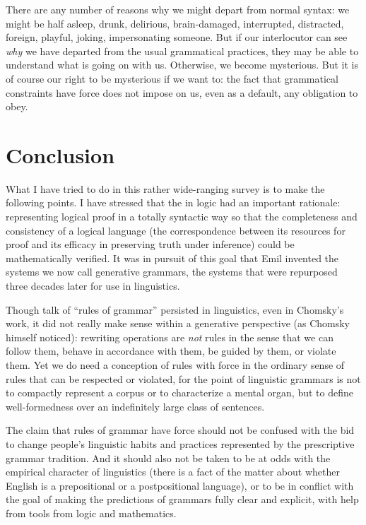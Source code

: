 \documentclass[output=paper]{langscibook}
\begin{document}
There are any number of reasons why we might depart from normal syntax: we might be half asleep, drunk, delirious, brain-damaged, interrupted, distracted, foreign, playful, joking, impersonating someone. But if our interlocutor can see \emph{why} we have departed from the usual grammatical practices, they may be able to understand what is going on with us. Otherwise, we become mysterious. But it is of course our right to be mysterious if we want to: the fact that grammatical constraints have  force does not impose on us, even as a default, any obligation to obey.

\section{Conclusion}
\label{sec:pullum:conc}

What I have tried to do in this rather wide-ranging survey is to make the following points. I have stressed that the  in logic had an important rationale: representing logical proof in a totally syntactic way so that the completeness and consistency of a logical language (the correspondence between its resources for proof and its efficacy in preserving truth under inference) could be mathematically verified.  It was in pursuit of this goal that Emil {\Post} invented the systems we now call generative grammars, the systems that were repurposed three decades later for use in linguistics.

Though talk of ``rules of grammar'' persisted in linguistics, even in Chomsky's work, it did not really make sense within a generative perspective (as Chomsky himself noticed): rewriting operations are \emph{not} rules in the sense that we can follow them, behave in accordance with them, be guided by them, or violate them.  Yet we do need a conception of rules with  force in the ordinary sense of rules that can be respected or violated, for the point of linguistic grammars is not to compactly represent a corpus or to characterize a mental organ, but to define well-formedness over an indefinitely large class of sentences.

The claim that rules of grammar have  force should not be confused with the bid to change people's linguistic habits and practices represented by the prescriptive grammar tradition. And it should also not be taken to be at odds with the empirical character of linguistics (there is a fact of the matter about whether English is a prepositional or a postpositional language), or to be in conflict with the goal of making the predictions of grammars fully clear and explicit, with help from tools from logic and mathematics.
\end{document}
